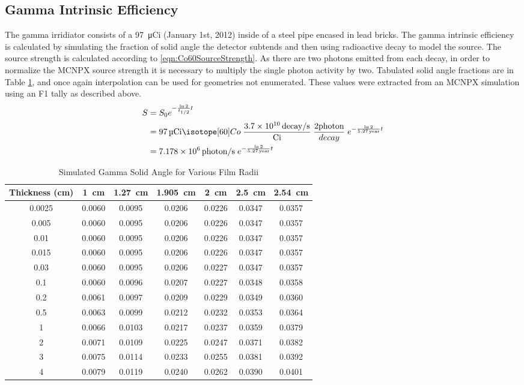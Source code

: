 \documentclass[draftcls,onecolumn]{IEEEtran}
\begin{document}
\subsection{Gamma Intrinsic Efficiency}
The gamma irridiator consists of a \SI{97}{\micro Ci}  (January 1st, 2012) inside of a steel pipe encased in lead bricks.
The gamma intrinsic efficiency is calculated by simulating the fraction of solid angle the detector subtends and then using radioactive decay to model the  source.
The  source strength is calculated according to \eqref{eqn:Co60SourceStrength}. 
As there are two photons emitted from each  decay, in order to normalize the MCNPX source strength it is necessary to multiply the single photon activity by two.
Tabulated solid angle fractions are in Table \ref{tab:GammaSolidAngle}, and once again interpolation can be used for geometries not enumerated.
These values were extracted from an MCNPX simulation using an F1 tally as described above.
\begin{align}
  \label{eqn:Co60SourceStrength}
  S &= S_0 e^{-\frac{\ln{2}}{t_{1/2}} t} \\ \notag 
    &= \SI{97}{\micro Ci} \iso[60]{Co}\; \frac{\SI{3.7E10}{decay\per\second}}{\si{Ci}} \;\frac{2\text{photon}}{decay}\;e^{-\frac{ \ln{2}}{\SI{5.27}{year}}t}  \\ \notag
    &= \SI{7.178E6}{photon\per\second}\;e^{-\frac{ \ln{2}}{\SI{5.27}{year}}t} 
\end{align}
\begin{table}
	\centering
	\caption{Simulated Gamma Solid Angle for Various Film Radii}
	\label{tab:GammaSolidAngle}
	\begin{tabular}{c | c c c c c c}
Thickness (\si{\cm})	&	\SI{1}{\cm}	&	\SI{1.27}{\cm}	&	\SI{1.905}{\cm}	&	\SI{2}{\cm}	&	\SI{2.5}{\cm}	&	\SI{2.54}{\cm} \\ \hline
0.0025	&	0.0060	&	0.0095	&	0.0206	&	0.0226	&	0.0347	&	0.0357\\
0.005	&	0.0060	&	0.0095	&	0.0206	&	0.0226	&	0.0347	&	0.0357\\
0.01	&	0.0060	&	0.0095	&	0.0206	&	0.0226	&	0.0347	&	0.0357\\
0.015	&	0.0060	&	0.0095	&	0.0206	&	0.0226	&	0.0347	&	0.0357\\
0.03	&	0.0060	&	0.0095	&	0.0206	&	0.0227	&	0.0347	&	0.0357\\
0.1	&	0.0060	&	0.0096	&	0.0207	&	0.0227	&	0.0348	&	0.0358\\
0.2	&	0.0061	&	0.0097	&	0.0209	&	0.0229	&	0.0349	&	0.0360\\
0.5	&	0.0063	&	0.0099	&	0.0212	&	0.0232	&	0.0353	&	0.0364\\
1	&	0.0066	&	0.0103	&	0.0217	&	0.0237	&	0.0359	&	0.0379\\
2	&	0.0071	&	0.0109	&	0.0225	&	0.0247	&	0.0371	&	0.0382\\
3	&	0.0075	&	0.0114	&	0.0233	&	0.0255	&	0.0381	&	0.0392\\
4	&	0.0079	&	0.0119	&	0.0240	&	0.0262	&	0.0390	&	0.0401\\
	\end{tabular}
\end{table}
\end{document}
